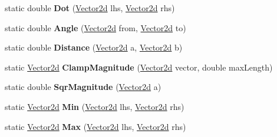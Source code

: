 \begin{DoxyCompactItemize}
static double {\bfseries Dot} (\hyperlink{struct_unity_engine_1_1_vector2d}{Vector2d} lhs, \hyperlink{struct_unity_engine_1_1_vector2d}{Vector2d} rhs)
\item 
\mbox{\label{struct_unity_engine_1_1_vector2d_a9a37829a34f1ce629b91c335842f842c}} 
static double {\bfseries Angle} (\hyperlink{struct_unity_engine_1_1_vector2d}{Vector2d} from, \hyperlink{struct_unity_engine_1_1_vector2d}{Vector2d} to)
\item 
\mbox{\label{struct_unity_engine_1_1_vector2d_a12f6521fad98bcb5ccbd9fddf49a0833}} 
static double {\bfseries Distance} (\hyperlink{struct_unity_engine_1_1_vector2d}{Vector2d} a, \hyperlink{struct_unity_engine_1_1_vector2d}{Vector2d} b)
\item 
\mbox{\label{struct_unity_engine_1_1_vector2d_a42def52ec6e0d493e60387a1f09912e0}} 
static \hyperlink{struct_unity_engine_1_1_vector2d}{Vector2d} {\bfseries Clamp\+Magnitude} (\hyperlink{struct_unity_engine_1_1_vector2d}{Vector2d} vector, double max\+Length)
\item 
\mbox{\label{struct_unity_engine_1_1_vector2d_a3da9a9a2a6d709397301e6b983b3dc0a}} 
static double {\bfseries Sqr\+Magnitude} (\hyperlink{struct_unity_engine_1_1_vector2d}{Vector2d} a)
\item 
\mbox{\label{struct_unity_engine_1_1_vector2d_a6bf33ee8696ebccda6e6cd8c117c30ae}} 
static \hyperlink{struct_unity_engine_1_1_vector2d}{Vector2d} {\bfseries Min} (\hyperlink{struct_unity_engine_1_1_vector2d}{Vector2d} lhs, \hyperlink{struct_unity_engine_1_1_vector2d}{Vector2d} rhs)
\item 
\mbox{\label{struct_unity_engine_1_1_vector2d_a99aac65326560891d6835427870c7908}} 
static \hyperlink{struct_unity_engine_1_1_vector2d}{Vector2d} {\bfseries Max} (\hyperlink{struct_unity_engine_1_1_vector2d}{Vector2d} lhs, \hyperlink{struct_unity_engine_1_1_vector2d}{Vector2d} rhs)
\end{DoxyCompactItemize}
